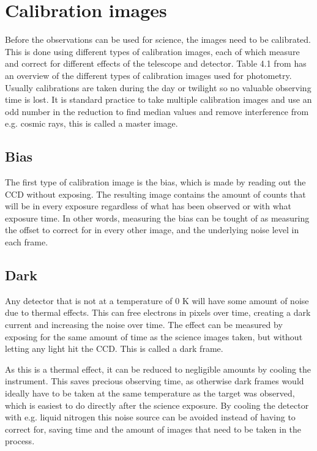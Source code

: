 \documentclass[a4paper,oneside,12pt, class=Latex/Classes/PhDthesisPSnPDF, crop=false]{standalone}
\begin{document}
\section{Calibration images}
\label{calibration}
Before the observations can be used for science, the images need to be calibrated. This is done using different types of calibration images, each of which measure and correct for different effects of the telescope and detector. Table 4.1 from \citet{CCD_handbook} has an overview of the different types of calibration images used for photometry. Usually calibrations are taken during the day or twilight so no valuable observing time is lost. It is standard practice to take multiple calibration images and use an odd number in the reduction to find median values and remove interference from e.g. cosmic rays, this is called a master image.


\subsection{Bias}
The first type of calibration image is the bias, which is made by reading out the CCD without exposing. The resulting image contains the amount of counts that will be in every exposure regardless of what has been observed or with what exposure time. In other words, measuring the bias can be tought of as measuring the offset to correct for in every other image, and the underlying noise level in each frame.


\subsection{Dark}
Any detector that is not at a temperature of 0 K will have some amount of noise due to thermal effects. This can free electrons in pixels over time, creating a dark current and increasing the noise over time. The effect can be measured by exposing for the same amount of time as the science images taken, but without letting any light hit the CCD. This is called a dark frame.

As this is a thermal effect, it can be reduced to negligible amounts by cooling the instrument. This saves precious observing time, as otherwise dark frames would ideally have to be taken at the same temperature as the target was observed, which is easiest to do directly after the science exposure. By cooling the detector with e.g. liquid nitrogen this noise source can be avoided instead of having to correct for, saving time and the amount of images that need to be taken in the process.
\end{document}
